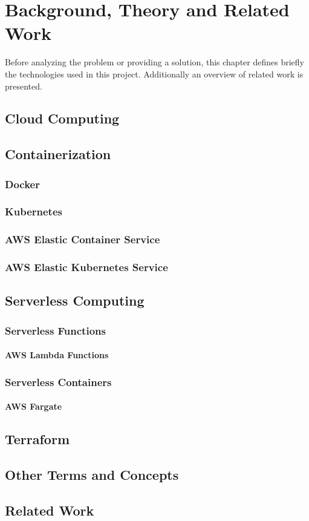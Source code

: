 \part{Background, Theory and Related Work}

Before analyzing the problem or providing a solution,
this chapter defines briefly the technologies used in this project.
Additionally an overview of related work is presented.

\chapter{Cloud Computing}

\chapter{Containerization}
\section{Docker}
\section{Kubernetes}
\section{AWS Elastic Container Service}
\section{AWS Elastic Kubernetes Service}

\chapter{Serverless Computing}
\section{Serverless Functions}
\subsection{AWS Lambda Functions}
\section{Serverless Containers}
\subsection{AWS Fargate}

\chapter{Terraform}

\chapter{Other Terms and Concepts}

\chapter{Related Work}
